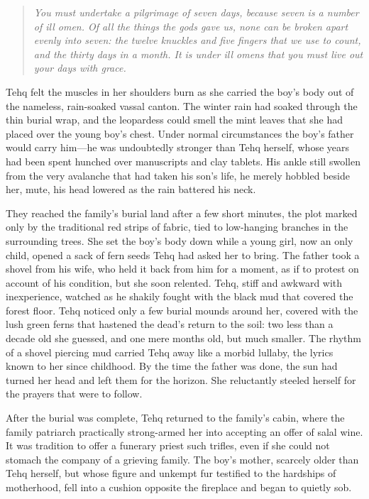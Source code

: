 \begin{quote}
\emph{You must undertake a pilgrimage of seven days, because seven is a number of ill omen. Of all the things the gods gave us, none can be broken apart evenly into seven: the twelve knuckles and five fingers that we use to count, and the thirty days in a month. It is under ill omens that you must live out your days with grace.}
\end{quote}

Tehq felt the muscles in her shoulders burn as she carried the boy's body out of the nameless, rain-soaked vassal canton. The winter rain had soaked through the thin burial wrap, and the leopardess could smell the mint leaves that she had placed over the young boy's chest. Under normal circumstances the boy's father would carry him---he was undoubtedly stronger than Tehq herself, whose years had been spent hunched over manuscripts and clay tablets. His ankle still swollen from the very avalanche that had taken his son's life, he merely hobbled beside her, mute, his head lowered as the rain battered his neck.

They reached the family's burial land after a few short minutes, the plot marked only by the traditional red strips of fabric, tied to low-hanging branches in the surrounding trees. She set the boy's body down while a young girl, now an only child, opened a sack of fern seeds Tehq had asked her to bring. The father took a shovel from his wife, who held it back from him for a moment, as if to protest on account of his condition, but she soon relented. Tehq, stiff and awkward with inexperience, watched as he shakily fought with the black mud that covered the forest floor. Tehq noticed only a few burial mounds around her, covered with the lush green ferns that hastened the dead's return to the soil: two less than a decade old she guessed, and one mere months old, but much smaller. The rhythm of a shovel piercing mud carried Tehq away like a morbid lullaby, the lyrics known to her since childhood. By the time the father was done, the sun had turned her head and left them for the horizon. She reluctantly steeled herself for the prayers that were to follow.

After the burial was complete, Tehq returned to the family's cabin, where the family patriarch practically strong-armed her into accepting an offer of salal wine. It was tradition to offer a funerary priest such trifles, even if she could not stomach the company of a grieving family. The boy's mother, scarcely older than Tehq herself, but whose figure and unkempt fur testified to the hardships of motherhood, fell into a cushion opposite the fireplace and began to quietly sob.

